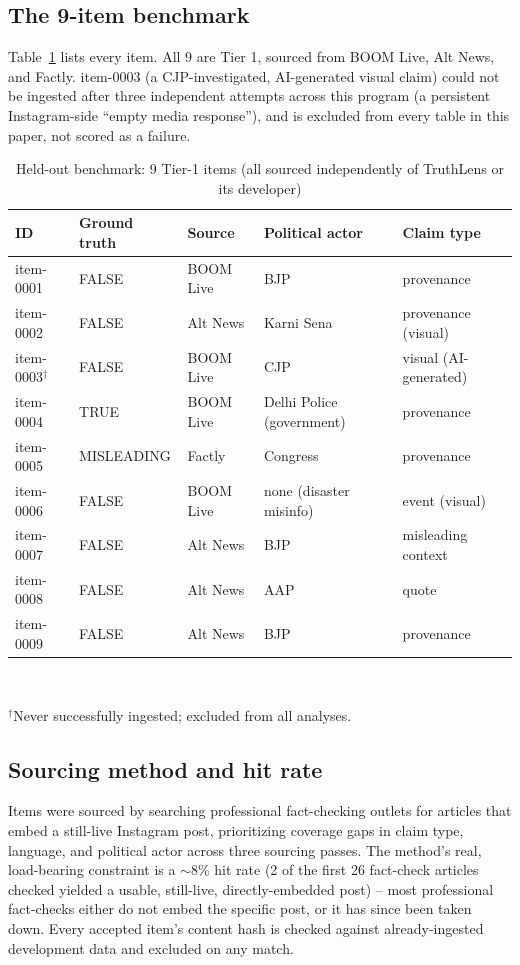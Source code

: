 \documentclass[conference]{IEEEtran}
\begin{document}
\subsection{The 9-item benchmark}
Table~\ref{tab:dataset} lists every item. All 9 are Tier 1, sourced from
BOOM Live, Alt News, and Factly. item-0003 (a CJP-investigated,
AI-generated visual claim) could not be ingested after three independent
attempts across this program (a persistent Instagram-side ``empty media
response''), and is excluded from every table in this paper, not scored as
a failure.

\begin{table}[!t]
\caption{Held-out benchmark: 9 Tier-1 items (all sourced independently of TruthLens or its developer)}
\label{tab:dataset}
\centering
\footnotesize
\begin{tabular}{lllll}
\toprule
ID & Ground truth & Source & Political actor & Claim type \\
\midrule
item-0001 & FALSE & BOOM Live & BJP & provenance \\
item-0002 & FALSE & Alt News & Karni Sena & provenance (visual) \\
item-0003$^\dagger$ & FALSE & BOOM Live & CJP & visual (AI-generated) \\
item-0004 & TRUE & BOOM Live & Delhi Police (government) & provenance \\
item-0005 & MISLEADING & Factly & Congress & provenance \\
item-0006 & FALSE & BOOM Live & none (disaster misinfo) & event (visual) \\
item-0007 & FALSE & Alt News & BJP & misleading context \\
item-0008 & FALSE & Alt News & AAP & quote \\
item-0009 & FALSE & Alt News & BJP & provenance \\
\bottomrule
\end{tabular}
\\[2pt]
\raggedright\footnotesize $^\dagger$Never successfully ingested; excluded from all analyses.
\end{table}

\subsection{Sourcing method and hit rate}
Items were sourced by searching professional fact-checking outlets for
articles that embed a still-live Instagram post, prioritizing coverage
gaps in claim type, language, and political actor across three sourcing
passes. The method's real, load-bearing constraint is a $\sim$8\% hit
rate (2 of the first 26 fact-check articles checked yielded a usable,
still-live, directly-embedded post) -- most professional fact-checks
either do not embed the specific post, or it has since been taken down.
Every accepted item's content hash is checked against already-ingested
development data and excluded on any match.
\end{document}
